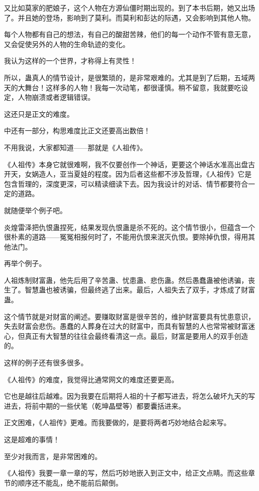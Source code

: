 \begin{this_body}
又比如莫家的肥娘子，这个人物在方源仙僵时期出现的。到了本书后期，她又出场了。并且她的登场，影响到了莫利。而莫利和彭达的际遇，又会影响到其他人物。

每个人物都有自己的想法，有自己的酸甜苦辣，他们的每一个动作不管有意无意，又会促使另外的人物的生命轨迹的变化。

我认为这样的一个世界，才称得上有灵性！

所以，蛊真人的情节设计，是很繁琐的，是非常艰难的。尤其是到了后期，五域两天的大舞台！这样多的人物！我每一次动笔，都很谨慎。稍不留意，我就要吃设定，人物崩溃或者逻辑错误。

这还只是正文的难度。

中还有一部分，构思难度比正文还要高出数倍！

不用我说，大家都知道——那就是《人祖传》。

《人祖传》本身它就很难啊，我不仅要创作一个神话，更要这个神话水准高出盘古开天，女娲造人，亚当夏娃的程度。因为后者这些都不涉及哲理，《人祖传》它是包含哲理的，深度更深，可以精读细读下去。因为我设计的对话、情节都要符合一定的道路。

就随便举个例子吧。

炎煌雷泽把仇恨蛊捏死，结果发现仇恨蛊是杀不死的。这个情节很小，但蕴含一个很朴素的道路——冤冤相报何时了，不能用仇恨来泯灭仇恨。要除掉仇恨，得用其他法门。

再举个例子。

人祖炼制财富蛊，他先后用了辛苦蛊、忧患蛊、悲伤蛊。然后愚蠢蛊被他诱骗，丧生了。智慧蛊也被诱骗，但最终逃了出来。最后，人祖失去了双手，才炼成了财富蛊。

这个情节就是对财富的阐述。要赚取财富是很辛苦的，维护财富要具有忧患意识，失去财富会悲伤。愚蠢的人葬身在过大的财富中，而具有智慧的人也常常被财富迷心，但真正有大智慧的往往会最终看清这一点。最后，财富是要用人的双手创造的。

这样的例子还有很多很多。

《人祖传》的难度，我觉得比通常网文的难度还要更高。

它也是越往后越难。因为我要在后期将人祖的十子都写进去，将怎么破坏九天的写进去，将前中期的一些伏笔（乾坤晶壁等）都要囊括进来。

正文困难，《人祖传》更难。而我要做的，是要将两者巧妙地结合起来写。

这是超难的事情！

至少对我而言，是非常困难的。

《人祖传》我要一章一章的写，然后巧妙地嵌入到正文中，给正文点睛。而这些章节的顺序还不能乱，绝不能前后颠倒。


\end{this_body}
